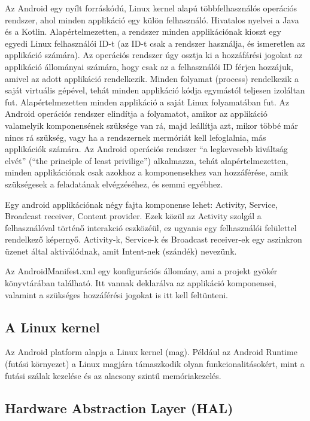 Az Android egy nyílt forráskódú, Linux kernel alapú többfelhasználós operációs rendszer, ahol minden applikáció egy külön felhasználó. Hivatalos nyelvei a Java és a Kotlin. Alapértelmezetten, a rendszer minden applikációnak kioszt egy egyedi Linux felhasználói ID-t (az ID-t csak a rendszer használja, és ismeretlen az applikáció számára). Az operációs rendszer úgy osztja ki a hozzáfárési jogokat az applikáció állományai számára, hogy csak az a felhasználói ID férjen hozzájuk, amivel az adott applikáció rendelkezik. Minden folyamat (process) rendelkezik a saját virtuális gépével, tehát minden applikáció kódja egymástól teljesen izoláltan fut. Alapértelmezetten minden applikáció a saját Linux folyamatában fut. Az Android operációs rendszer elindítja a folyamatot, amikor az applikáció valamelyik komponensének szüksége van rá, majd leállítja azt, mikor többé már nincs rá szükség, vagy ha a rendszernek mermóriát kell lefoglalnia, más applikációk számára. Az Android operációs rendszer “a legkevesebb kiváltság elvét” (“the principle of least privilige”) alkalmazza, tehát alapértelmezetten, minden applikációnak csak azokhoz a komponensekhez van hozzáférése, amik szükségesek a feladatának elvégzéséhez, és semmi egyébhez.

Egy android applikációnak négy fajta komponense lehet: Activity, Service, Broadcast receiver, Content provider. Ezek közül az Activity szolgál a felhasználóval történő interakció eszközéül, ez ugyanis egy felhasználói felülettel rendelkező képernyő. Activity-k, Service-k és Broadcast receiver-ek egy aszinkron üzenet által aktiválódnak, amit Intent-nek (szándék) nevezünk.

Az AndroidManifest.xml egy konfigurációs állomány, ami a projekt gyökér könyvtárában található. Itt vannak deklarálva az applikáció komponensei, valamint a szükséges hozzáférési jogokat is itt kell feltünteni.

\subsection{A Linux kernel}

Az Android platform alapja a Linux kernel (mag). Például az Android Runtime (futási környezet) a Linux magjára támaszkodik olyan funkcionalitásokért, mint a futási szálak kezelése és az alacsony szintű memóriakezelés.

\subsection{Hardware Abstraction Layer (HAL)}

